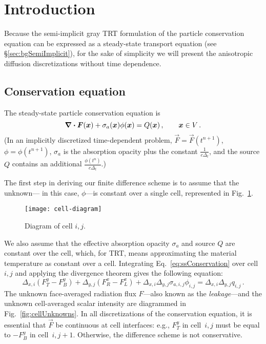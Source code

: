 \section{Introduction}

Because the semi-implicit gray TRT formulation of the particle conservation
equation can be expressed as a steady-state transport equation (see
\S\ref{sec:bgSemiImplicit}), for the sake of simplicity we will present the
anisotropic diffusion discretizations without time dependence.

\subsection{Conservation equation}

The steady-state particle conservation equation is
\begin{equation}\label{eq:ssConservation}
  \bm{\nabla} \bm{\cdot} \bm{F}(\bm{x}) + \sigma_a(\bm{x}) \phi(\bm{x}) =
  Q(\bm{x})\,,\qquad \bm{x} \in V\,.
\end{equation}
(In an implicitly discretized time-dependent problem,
$\vec{F}=\vec{F}(t^{n+1})$, $\phi=\phi(t^{n+1})$, $\sigma_a$ is 
the absorption opacity plus the constant $\frac{1}{c\Delta_t}$, and the source
$Q$ contains an additional $\frac{\phi(t^{n})}{c\Delta_t}$.) 

The first step in deriving our finite difference scheme is to assume that the
unknown---%
in this case, $\phi$---is constant over a single cell, represented in
Fig.~\ref{fig:cellDiagram}. 
%
\begin{figure}[tb]
  \centering
  \texttt{[image: cell-diagram]}
  \caption{Diagram of cell $i,j$.}
  \label{fig:cellDiagram}
\end{figure}
%
We also assume that the effective absorption opacity $\sigma_a$ and source $Q$
are
constant over the cell, which, for TRT, means approximating the material
temperature as constant over a cell. Integrating Eq.~\eqref{eq:ssConservation} over cell
$i,j$ and applying the divergence theorem gives the following equation:
\begin{equation} \label{eq:ssConservationDisc}
  \Delta_{x,i} \left( F_T^y - F_B^y \right)
+ \Delta_{y,j} \left( F_R^x - F_L^x \right)
+ \Delta_{x,i}\Delta_{y,j} \sigma_{a,i,j} \phi_{i,j}
= \Delta_{x,i}\Delta_{y,j} q_{i,j}\,.
\end{equation}
The unknown face-averaged radiation flux $F$---also known as the
\emph{leakage}---and the
unknown cell-averaged scalar intensity are diagrammed in
Fig.~\ref{fig:cellUnknowns}.
In all discretizations of the conservation equation, it is
essential that
$\vec{F}$ be continuous at cell interfaces: e.g., $F_T^y$ in cell~$i,j$ must
be equal to $-F_B^y$ in cell~$i,{j+1}$. Otherwise, the difference scheme is not
conservative.

